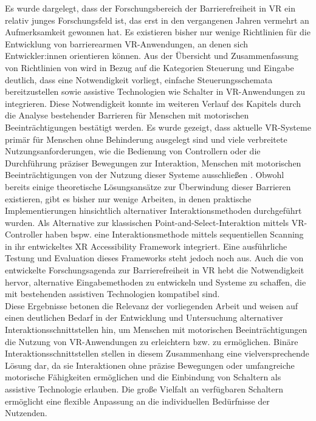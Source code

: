 Es wurde dargelegt, dass der Forschungsbereich der Barrierefreiheit in VR ein relativ junges Forschungsfeld ist, das erst in den vergangenen Jahren vermehrt an Aufmerksamkeit gewonnen hat. Es existieren bisher nur wenige Richtlinien für die Entwicklung von barrierearmen VR-Anwendungen, an denen sich Entwickler:innen orientieren können. Aus der Übersicht und Zusammenfassung von Richtlinien von \citet{heilemann_accessibility_2021} wird in Bezug auf die Kategorien Steuerung und Eingabe deutlich, dass eine Notwendigkeit vorliegt, einfache Steuerungsschemata bereitzustellen sowie assistive Technologien wie Schalter in VR-Anwendungen zu integrieren. Diese Notwendigkeit konnte im weiteren Verlauf des Kapitels durch die Analyse bestehender Barrieren für Menschen mit motorischen Beeinträchtigungen bestätigt werden. Es wurde gezeigt, dass aktuelle VR-Systeme primär für Menschen ohne Behinderung ausgelegt sind \citep{wong_survey_2017} und viele verbreitete Nutzungsanforderungen, wie die Bedienung von Controllern oder die Durchführung präziser Bewegungen zur Interaktion, Menschen mit motorischen Beeinträchtigungen von der Nutzung dieser Systeme ausschließen \citep{10.1007/978-3-030-21607-8_3}. Obwohl bereits einige theoretische Lösungsansätze zur Überwindung dieser Barrieren existieren, gibt es bisher nur wenige Arbeiten, in denen praktische Implementierungen hinsichtlich alternativer Interaktionsmethoden durchgeführt wurden. Als Alternative zur klassischen Point-and-Select-Interaktion mittels VR-Controller haben bspw. \citet{valakou_framework_2024} eine Interaktionsmethode mittels sequentiellen Scanning in ihr entwickeltes XR Accessibility Framework integriert. Eine ausführliche Testung und Evaluation dieses Frameworks steht jedoch noch aus. Auch die von \citet{creed_inclusive_2024_2} entwickelte Forschungsagenda zur Barrierefreiheit in VR hebt die Notwendigkeit hervor, alternative Eingabemethoden zu entwickeln und Systeme zu schaffen, die mit bestehenden assistiven Technologien kompatibel sind.\\
Diese Ergebnisse betonen die Relevanz der vorliegenden Arbeit und weisen auf einen deutlichen Bedarf in der Entwicklung und Untersuchung alternativer Interaktionsschnittstellen hin, um Menschen mit motorischen Beeinträchtigungen die Nutzung von VR-Anwendungen zu erleichtern bzw. zu ermöglichen. Binäre Interaktionsschnittstellen stellen in diesem Zusammenhang eine vielversprechende Lösung dar, da sie Interaktionen ohne präzise Bewegungen oder umfangreiche motorische Fähigkeiten ermöglichen und die Einbindung von Schaltern als assistive Technologie erlauben. Die große Vielfalt an verfügbaren Schaltern ermöglicht eine flexible Anpassung an die individuellen Bedürfnisse der Nutzenden. 

